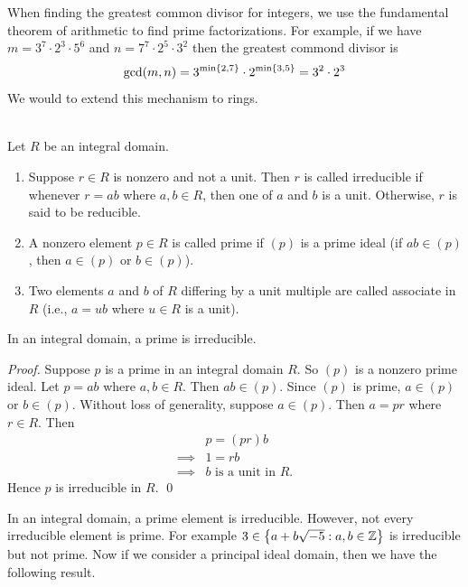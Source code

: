 When finding the greatest common divisor for integers, we use the fundamental theorem of arithmetic to find prime factorizations. For example, if we have $m = 3^7 \cdot 2^3 \cdot 5^6$ and $n=7^7 \cdot 2^5 \cdot 3^2$ then the greatest commond divisor is
$$\gcd(m,n) = 3^{\min\left\{2,7\right\}}\cdot 2^{\min\left\{3,5\right\}}=3^2 \cdot 2^3$$
We would to extend this mechanism to rings.

\begin{definition} \leavevmode \\
    Let $R$ be an integral domain.
    \begin{enumerate}
        \item Suppose $r\in R$ is nonzero and not a unit. Then $r$ is called irreducible if whenever $r=ab$ where $a,b\in R$, then one of $a$ and $b$ is a unit. Otherwise, $r$ is said to be reducible.
        \item A nonzero element $p \in R$ is called prime if $(p)$ is a prime ideal (if $ab\in (p)$, then $a\in(p)$ or $b\in(p)$).
        \item Two elements $a$ and $b$ of $R$ differing by a unit multiple are called associate in $R$ (i.e., $a=ub$ where $u \in R$ is a unit).
    \end{enumerate}
\end{definition}

\begin{proposition}
    In an integral domain, a prime is irreducible.
\end{proposition}

\begin{proof}
    Suppose $p$ is a prime in an integral domain $R$. So $(p)$ is a nonzero prime ideal. Let $p=ab$ where $a,b\in R$. Then $ab \in (p)$. Since $(p)$ is prime, $a\in (p)$ or $b\in (p)$. Without loss of generality, suppose $a \in (p)$. Then $a = pr$ where $r \in R$. Then 
    \begin{align*}
        &p = (pr)b \\
        \implies &1 = rb \\
        \implies &\text{$b$ is a unit in $R$.}
    \end{align*}
    Hence $p$ is irreducible in $R$.
    \qed
\end{proof}

In an integral domain, a prime element is irreducible. However, not every irreducible element is prime. For example $3 \in \left\{a + b \sqrt{-5} : a,b \in \mathbb{Z}\right\}$ is irreducible but not prime. Now if we consider a principal ideal domain, then we have the following result.

